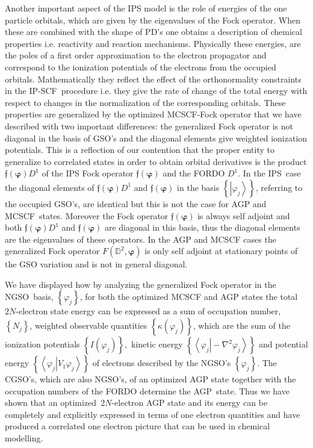 \documentclass[aps,preprint]{revtex4}%
\begin{document}
Another important aspect of the IPS model is the role of energies of the one
particle orbitals, which are given by the eigenvalues of the Fock operator.
When these are combined with the shape of PD's one obtains a description of
chemical properties i.e. reactivity and reaction mechanisms. Physically these
energies, are the poles of a first order approximation to the electron
propagator and correspond to the ionization potentials of the electrons from
the occupied orbitals. Mathematically they reflect the effect of the
orthonormality constraints in the IP-SCF\ procedure i.e. they give the rate of
change of the total energy with respect to changes in the normalization of the
corresponding orbitals. These properties are generalized by the optimized
MCSCF-Fock operator that we have described with two important differences: the
generalized Fock operator is not diagonal in the basis of GSO's and the
diagonal elements give weighted ionization potentials. This is a reflection of
our contention that the proper entity to generalize to correlated states in
order to obtain orbital derivatives is the product $\mathfrak{f}\left(
\bm{\varphi}\right)  D^{1}$ of the IPS Fock operator $\mathfrak{f}\left(
\bm{\varphi}\right)  $ and the FORDO $D^{1}$. In the IPS\ case the diagonal
elements of $\mathfrak{f}\left(  \bm{\varphi}\right)  D^{1}$ and
$\mathfrak{f}\left(  \bm{\varphi}\right)  $ in the basis $\left\{  \left\vert
\varphi_{j}\right\rangle \right\}  $, referring to the occupied GSO's, are
identical but this is not the case for AGP and MCSCF\ states. Moreover the
Fock operator $\mathfrak{f}\left(  \bm{\varphi}\right)  $ is always self
adjoint and both $\mathfrak{f}\left(  \bm{\varphi}\right)  D^{1}$ and
$\mathfrak{f}\left(  \bm{\varphi}\right)  $ are diagonal in this basis, thus
the diagonal elements are the eigenvalues of these operators. In the AGP and
MCSCF cases the generalized Fock operator $F\left(  \mathbb{D}^{2}%
,\bm{\varphi}\right)  $ is only self adjoint at stationary points of the GSO
variation and is not in general diagonal.

We have displayed how by analyzing the generalized Fock operator in the
NGSO\ basis, $\left\{  \varphi_{j}\right\}  $, for both the optimized MCSCF
and AGP states the total $2N$-electron state energy can be expressed as a sum
of occupation number, $\left\{  N_{j}\right\}  $, weighted observable
quantities $\left\{  \kappa\left(  \varphi_{j}\right)  \right\}  $, which are
the sum of the ionization potentials $\left\{  I\left(  \varphi_{j}\right)
\right\}  ,$ kinetic energy $\left\{  \left\langle \left.  \varphi
_{j}\right\vert -\nabla^{2}\varphi_{j}\right\rangle \right\}  $ and potential
energy $\left\{  \left\langle \left.  \varphi_{j}\right\vert V_{1}\varphi
_{j}\right\rangle \right\}  $ of electrons described by the NGSO's $\left\{
\varphi_{j}\right\}  $. The CGSO's, which are also NGSO's, of an optimized AGP
state together with the occupation numbers of the FORDO determine the
AGP\ state. Thus we have shown that an optimized~$2N$-electron AGP state and
its energy can be completely and explicitly expressed in terms of one electron
quantities and have produced a correlated one electron picture that can be
used in chemical modelling.
\end{document}
